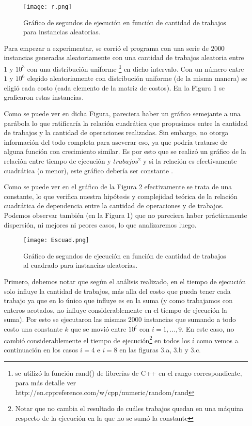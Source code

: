\documentclass[A4paper,oneside,fleqn,11pt]{article}
\theoremstyle{definition}
\begin{document}
\begin{wrapfigure}{R}{0.4\textwidth}
\centering
\texttt{[image: r.png]}
\caption{ Gráfico de segundos de ejecución en función de cantidad de trabajos para instancias aleatorias.}
\end{wrapfigure}
Para empezar a experimentar, se corrió el programa con una serie de $2000$ instancias generadas aleatoriamente con una cantidad de trabajos aleatoria entre $1$ y $10^3$  con una distribución uniforme
\footnote{ se utilizó la función rand() de librerías de C++ en el rango correspondiente, para más detalle ver http://en.cppreference.com/w/cpp/numeric/random/rand }
en dicho intervalo. Con un número entre $1$ y $10^6$ elegido aleatoriamente con distribución uniforme (de la misma manera) se eligió cada costo  (cada elemento de la matriz de costos). En la Figura 1 se graficaron estas instancias.



Como se puede ver en dicha Figura, pareciera haber un gráfico semejante a una parábola lo que ratificaría la relación cuadrática que propusimos entre la cantidad de trabajos y la cantidad de operaciones realizadas. Sin embargo, no otorga información del todo completa para aseverar eso, ya que podría tratarse de alguna función con crecimiento similar. Es por esto que se realizó un gráfico de la relación entre tiempo de ejecución y $trabajos^2$ y si la relación es efectivamente cuadrática (o menor), este gráfico debería ser constante .

Como se puede ver en el gráfico de la Figura 2 efectivamente se trata de una constante, lo que verifica nuestra hipótesis y complejidad teórica de la relación cuadrática de dependencia entre la cantidad de operaciones y de trabajos. Podemos observar también (en la Figura 1) que no pareciera haber prácticamente dispersión, ni mejores ni peores casos, lo que analizaremos luego.

\break

\begin{wrapfigure}[10]{L}{0.25\textwidth}
	\texttt{[image: Escuad.png]}
	\caption{ Gráfico de segundos de ejecución en función de cantidad de trabajos al cuadrado para instancias aleatorias.}
\end{wrapfigure}

Primero, debemos notar que según el análisis realizado, en el tiempo de ejecución solo influye la cantidad de trabajos, más alla del costo que pueda tener cada trabajo ya que en lo único que influye es en la suma (y como trabajamos con enteros acotados, no influye considerablemente en el tiempo de ejecución la suma). Por esto se ejecutaron las mismas $2000$ instancias que sumando a todo costo una constante $k$ que se movió entre $10^i$ con $i=1,...,9$. En este caso, no cambió considerablemente el tiempo de ejecución\footnote{Notar que no cambia el resultado de cuáles trabajos quedan en una máquina respecto de la ejecución en la que no se sumó la constante} en todos los $i$ como vemos a continuación en los casos $i=4$ e $i=8$ en las figuras 3.a, 3.b y 3.c.
\end{document}
